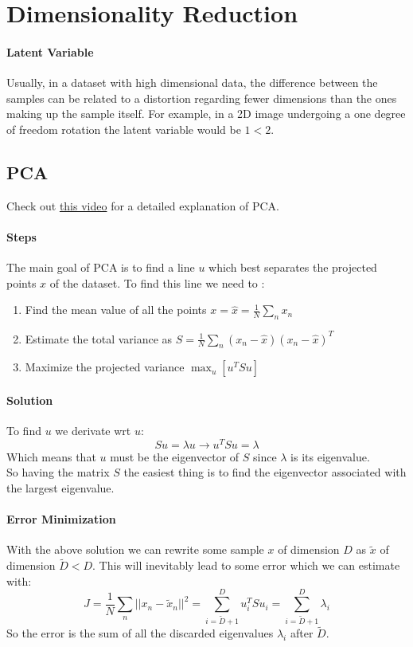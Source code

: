 \section{Dimensionality Reduction}

\paragraph{Latent Variable}
Usually, in a dataset with  high dimensional data, the difference between the samples can be related to a distortion regarding fewer dimensions than the ones making up the sample itself. For example, in a 2D image undergoing a one degree of freedom rotation the latent variable would be $1 < 2$.\\

\subsection{PCA} 
Check out \hyperlink{https://www.youtube.com/watch?v=FgakZw6K1QQ}{this video} for a detailed explanation of PCA.\\

\paragraph{Steps}
The main goal of PCA is to find a line $u$ which best separates the projected points $x$ of the dataset. To find this line we need to :
\begin{enumerate}
\item Find the mean value of all the points $x=\hat{x}=\frac{1}{N}\sum_nx_n$
\item Estimate the total variance as $S=\frac{1}{N}\sum_n(x_n-\hat{x})(x_n-\hat{x})^T$
\item Maximize the projected variance $\max_{u}[u^TSu]$ 
\end{enumerate}

\paragraph{Solution}
To find $u$ we derivate wrt $u$:
$$S u=\lambda u \to u^TSu=\lambda$$
Which means that $u$ must be the eigenvector of $S$ since $\lambda$ is its eigenvalue.\\
So having the matrix $S$ the easiest thing is to find the eigenvector associated with the largest eigenvalue.

\paragraph{Error Minimization}
With the above solution we can rewrite some sample $x$ of dimension $D$ as $\tilde{x}$ of dimension $\tilde{D}<D$. This will inevitably lead to some error which we can estimate with:
$$J=\frac{1}{N}\sum_n ||x_n-\tilde{x}_n||^2=\sum_{i=\tilde{D}+1}^D u_i^T S u_i=\sum_{i=\tilde{D}+1}^D \lambda_i$$
So the error is the sum of all the discarded eigenvalues $\lambda_i$ after $\tilde{D}$.

